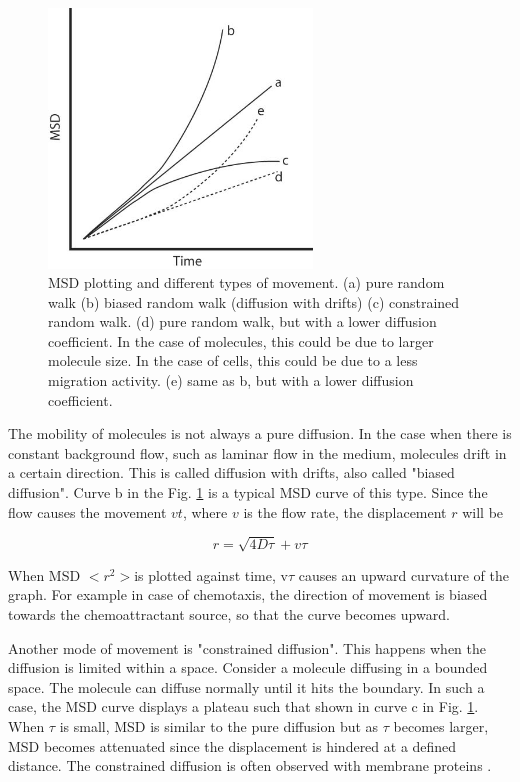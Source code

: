 \begin{figure}[htbp]
\begin{center}
\includegraphics[width=7cm]{fig/CMCIBasicCourse201102-img151.jpg}
\caption{ MSD plotting and different types of movement. (a) pure random walk (b) biased random walk (diffusion with drifts) (c)
constrained random walk. (d) pure random walk, but with a lower
diffusion coefficient. In the case of molecules, this could be due to
larger molecule size. In the case of cells, this could be due to a less
migration activity. (e) same as b, but with a lower diffusion
coefficient. }
\label{fig:img151}
\end{center}
\end{figure}

The mobility of molecules is not always a pure diffusion. In the case
when there is constant background flow, such as laminar flow in the
medium, molecules drift in a certain direction. This is called
diffusion with drifts, also called "biased
diffusion". Curve b in the Fig. \ref{fig:img151} is a typical MSD
curve of this type. Since the flow causes the movement $vt$,
where $v$ is the flow rate, the displacement $r$ will be


\begin{equation}
r = \sqrt{4 D \tau} + v\tau
\end{equation}

When MSD $<r^{2}>$is plotted
against time, v$\tau$ causes an upward curvature of the
graph. For example in case of chemotaxis, the direction of movement is
biased towards the chemoattractant source, so that the curve becomes
upward.

Another mode of movement is "constrained
diffusion". This happens when the diffusion is limited
within a space. Consider a molecule diffusing in a bounded space. The
molecule can diffuse normally until it hits the boundary. In such a
case, the MSD curve displays a plateau such that shown in curve c in
Fig. \ref{fig:img151}. When $\tau$ is small, MSD is similar
to the pure diffusion but as $\tau$ becomes larger, MSD
becomes attenuated since the displacement is hindered at a defined
distance. The constrained diffusion is often observed with membrane
proteins \citep{saxtonBJ1997}.




